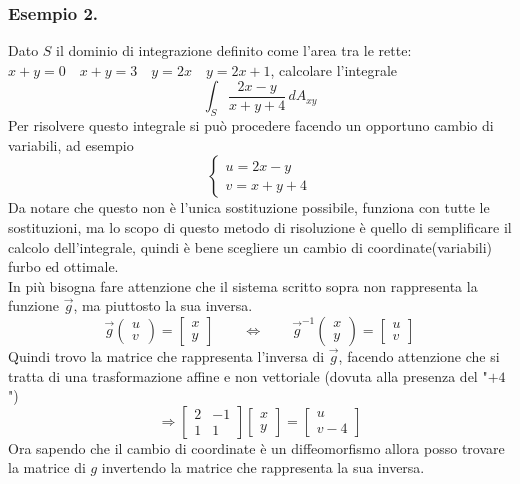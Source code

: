 \documentclass[10pt]{article}
\theoremstyle{plain}
\theoremstyle{definition}
\begin{document}
\subsubsection{Esempio 2.}
Dato $S$ il dominio di integrazione definito come l'area tra le rette:\\
$x+y=0 \quad x+y=3 \quad y=2x \quad y=2x+1$, calcolare l'integrale
$$\int_S \frac{2x-y}{x+y+4} \,dA_{xy}$$
Per risolvere questo integrale si può procedere facendo un opportuno cambio di variabili, ad esempio
$$\begin{cases}
 u = 2x-y \\ v=x+y+4
\end{cases}$$
Da notare che questo non è l'unica sostituzione possibile, funziona con tutte le sostituzioni, ma lo scopo di questo metodo di risoluzione è quello di semplificare il calcolo dell'integrale, quindi è bene scegliere un cambio di coordinate(variabili) furbo ed ottimale.\\
In più bisogna fare attenzione che il sistema scritto sopra non rappresenta la funzione $\vec{g}$, ma piuttosto la sua inversa.
$$\vec{g} \left( \begin{matrix} u \\ v \end{matrix}\right) = \begin{bmatrix} x\\ y \end{bmatrix} \qquad \Leftrightarrow \qquad \vec{g}^{-1} \left( \begin{matrix} x \\ y \end{matrix}\right) = \begin{bmatrix} u\\ v \end{bmatrix} $$
Quindi trovo la matrice che rappresenta l'inversa di $\vec{g}$, facendo attenzione che si tratta di una trasformazione affine e non vettoriale (dovuta alla presenza del "$+4$")
$$\Rightarrow \begin{bmatrix} 2 & -1 \\ 1 & 1  \end{bmatrix} \begin{bmatrix} x \\ y \end{bmatrix} = \begin{bmatrix} u \\ v-4  \end{bmatrix}$$
Ora sapendo che il cambio di coordinate è un diffeomorfismo allora posso trovare la matrice di $g$ invertendo la matrice che rappresenta la sua inversa.
\end{document}
